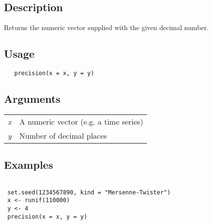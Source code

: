 \documentclass[12pt,letterpaper]{article}
\begin{document}
\subsection*{Description}

Returns the numeric vector supplied with the given decimal number.

\vspace{0.5cm}

\subsection*{Usage}

\begin{lstlisting}
   precision(x = x, y = y)
\end{lstlisting}

\vspace{0.5cm}

\newpage

\subsection*{Arguments}

\begin{table}[!ht]
\begin{center}
\begin{tabularx}{\textwidth}{X X}
\hspace{0.5cm} \textit{x} & A numeric vector (e.g. a time series)\\
\hspace{0.5cm} \textit{y} & Number of decimal places\\
\end{tabularx}
\end{center}
\end{table} 

\subsection*{Examples}

\begin{lstlisting}
   
 set.seed(1234567890, kind = "Mersenne-Twister")
 x <- runif(110000)
 y <- 4
 precision(x = x, y = y)

\end{lstlisting}

\vspace{0.5cm}

\end{document}
